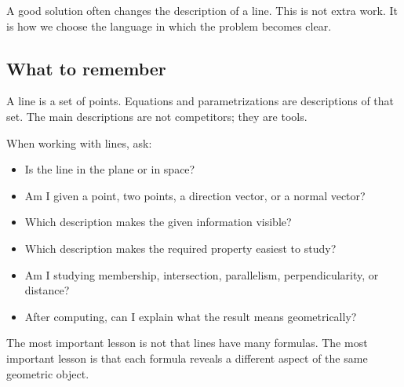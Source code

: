 \begin{remarkbox}
A good solution often changes the description of a line. This is not extra work. It is how we choose the language in which the problem becomes clear.
\end{remarkbox}

\subsection*{What to remember}

A line is a set of points. Equations and parametrizations are descriptions of that set. The main descriptions are not competitors; they are tools.

\begin{summarybox}
When working with lines, ask:
\begin{itemize}
\item Is the line in the plane or in space?
\item Am I given a point, two points, a direction vector, or a normal vector?
\item Which description makes the given information visible?
\item Which description makes the required property easiest to study?
\item Am I studying membership, intersection, parallelism, perpendicularity, or distance?
\item After computing, can I explain what the result means geometrically?
\end{itemize}
\end{summarybox}

The most important lesson is not that lines have many formulas. The most important lesson is that each formula reveals a different aspect of the same geometric object.